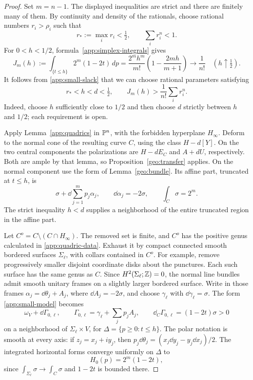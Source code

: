 \begin{proof}
Set $m=n-1$. The displayed inequalities are strict and there are finitely
many of them. By continuity and density of the rationals, choose rational
numbers $r_i>\rho_i$ such that
\begin{equation}\label{app:small-slack}
 r_*:=\max_i r_i<\tfrac12,\qquad \sum_i r_i^n<1.
\end{equation}
For $0<h<1/2$, formula~\eqref{app:simplex-integrals} gives
\begin{equation}\label{app:small-volume}
 J_m(h):=\int_{\{t\le h\}}2^m(1-2t)\,dp
 =\frac{2^mh^m}{m!}\left(1-\frac{2mh}{m+1}\right)
 \longrightarrow\frac1{n!}
 \quad(h\uparrow\tfrac12).
\end{equation}
It follows from \eqref{app:small-slack} that we can choose rational
parameters satisfying
\begin{equation}\label{app:small-truncation}
 r_*<h<d<\tfrac12,\qquad
 J_m(h)>\frac1{n!}\sum_i r_i^n.
\end{equation}
Indeed, choose $h$ sufficiently close to $1/2$ and then choose $d$ strictly
between $h$ and $1/2$; each requirement is open.

Apply Lemma~\ref{app:quadrics} in $\mathbb P^n$, with the forbidden hyperplane
$H_\infty$. Deform to the normal cone of the resulting curve $C$, using
the class $H-d[Y]$. On the two central components the polarizations are
$H-dE_C$ and $A+dU$, respectively. Both are ample by that lemma, so
Proposition~\ref{geo:transfer} applies. On the normal component use the
form of Lemma~\ref{geo:bundle}. Its affine part, truncated at $t\le h$, is
\begin{equation}\label{app:small-model}
 \sigma+\dd\sum_{j=1}^m p_j\alpha_j,
 \qquad \dd\alpha_j=-2\sigma,\qquad
 \int_C\sigma=2^m.
\end{equation}
The strict inequality $h<d$ supplies a neighborhood of the entire
truncated region in the affine part.

Let $C^o=C\setminus(C\cap H_\infty)$. The removed set is finite, and $C^o$
has the positive genus calculated in \eqref{app:quadric-data}. Exhaust it
by compact connected smooth bordered surfaces $\Sigma_\ell$, with collars
contained in $C^o$. For example, remove progressively smaller disjoint
coordinate disks about the punctures. Each such surface has the same genus
as $C$. Since $H^2(\Sigma_\ell;\mathbb Z)=0$, the normal line bundles admit smooth
unitary frames on a slightly larger bordered surface. Write in those frames
$\alpha_j=\dd\theta_j+A_j$, where $\dd A_j=-2\sigma$, and choose
$\gamma_\ell$ with $\dd\gamma_\ell=\sigma$. The form
\eqref{app:small-model} becomes
\[
 \omega_V+\dd\Gamma_{0,\ell},\qquad
 \Gamma_{0,\ell}=\gamma_\ell+\sum_jp_jA_j,\qquad
 \dd_C\Gamma_{0,\ell}=(1-2t)\sigma>0
\]
on a neighborhood of $\Sigma_\ell\times V$, for
$\Delta=\{p\ge0:t\le h\}$. The polar notation is smooth at every axis:
if $z_j=x_j+iy_j$, then
$p_j\dd\theta_j=(x_j\dd y_j-y_j\dd x_j)/2$.
The integrated horizontal forms converge uniformly on $\Delta$ to
\[
 H_0(p)=2^m(1-2t),
\]
since $\int_{\Sigma_\ell}\sigma\to\int_C\sigma$ and $1-2t$ is bounded
there.


\end{proof}
